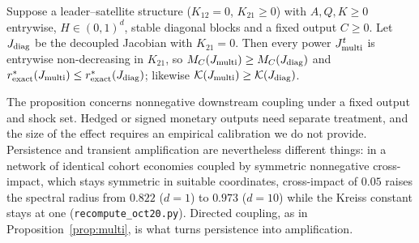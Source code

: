 \begin{proposition}\label{prop:multi}
Suppose a leader--satellite structure ($K_{12}=0$, $K_{21}\ge0$) with $A,Q,K\ge0$ entrywise, $H\in(0,1)^d$, stable diagonal blocks and a fixed output $C\ge0$. Let $J_{\rm diag}$ be the decoupled Jacobian with $K_{21}=0$. Then every power $J_{\rm multi}^t$ is entrywise non-decreasing in $K_{21}$, so $M_C(J_{\rm multi})\ge M_C(J_{\rm diag})$ and $r^*_{\rm exact}(J_{\rm multi})\le r^*_{\rm exact}(J_{\rm diag})$; likewise $\mathcal K(J_{\rm multi})\ge\mathcal K(J_{\rm diag})$.
\end{proposition}

The proposition concerns nonnegative downstream coupling under a fixed output and shock set. Hedged or signed monetary outputs need separate treatment, and the size of the effect requires an empirical calibration we do not provide. Persistence and transient amplification are nevertheless different things: in a network of identical cohort economies coupled by symmetric nonnegative cross-impact, which stays symmetric in suitable coordinates, cross-impact of $0.05$ raises the spectral radius from $0.822$ ($d=1$) to $0.973$ ($d=10$) while the Kreiss constant stays at one (\texttt{recompute\_oct20.py}). Directed coupling, as in Proposition~\ref{prop:multi}, is what turns persistence into amplification.
